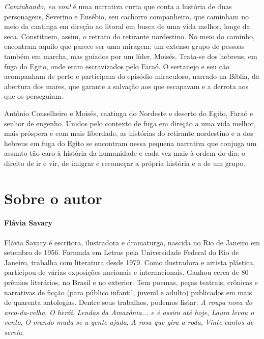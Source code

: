 \documentclass[11pt]{extarticle}
\begin{document}
\textit{Caminhando, eu vou!} é uma narrativa curta que conta a história de duas personagens, Severino e Eusébio,
seu cachorro companheiro, que caminham no meio da caatinga em direção ao litoral em busca de uma vida melhor, 
longe da seca. Constituem, assim, o retrato do retirante nordestino. 
No meio do caminho, encontram aquilo que parece ser uma miragem: um extenso grupo de pessoas também em marcha,
mas guiados por um líder, Moisés. Trata-se dos hebreus, em fuga do Egito, onde eram escravizados
pelo Faraó. O sertanejo e seu cão acompanham de perto e participam do episódio miraculoso, narrado na Bíblia,
da abertura dos mares, que garante a salvação aos que escapavam e a derrota aos que os perseguiam. 

Antônio Conselheiro e Moisés, caatinga do Nordeste e deserto do Egito, 
Faraó e senhor de engenho. Unidos pelo contexto de fuga em direção a uma vida melhor, mais próspera e com mais liberdade,
as histórias do retirante nordestino e a dos hebreus em fuga do Egito se encontram nessa pequena narrativa que
conjuga um assunto tão caro à história da humanidade e cada vez mais à ordem do dia:
o direito de ir e vir, de imigrar e recomeçar a própria história e a de um grupo. 


\section{Sobre o autor}

\paragraph{Flávia Savary}


Flávia Savary é escritora, ilustradora e dramaturga, nascida no Rio de Janeiro em setembro de 1956. 
Formada em Letras pela Universidade Federal do Rio de Janeiro, trabalha com literatura desde 1979.
Como ilustradora e artista plástica, participou de várias exposições nacionais e internacionais.
Ganhou cerca de 80 prêmios literários, no Brasil e no exterior. Tem poemas, peças teatrais, crônicas e narrativas de ficção 
(para público infantil, juvenil e adulto) publicados em mais de quarenta antologias.
Dentre seus trabalhos, podemos listar: \textit{A roupa nova do arco-da-velha}, \textit{O herói}, \textit{Lendas da Amazônia... e é assim até hoje}, \textit{Laura levou o vento}, \textit{O mundo muda se a gente ajuda}, \textit{A rosa que gira a roda},
\textit{Vinte cantos de sereia}.
\end{document}

